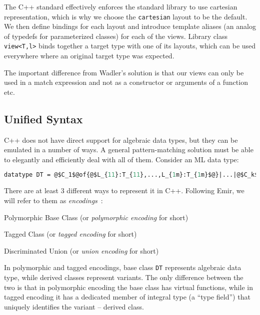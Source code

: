 \documentclass{llncs}
\makeatletter
\DeclareRobustCommand{\code}[1]{{\lstinline[keepspaces,breaklines=false,escapechar=@]{#1}}}
\makeatother
\begin{document}
\noindent
The C++ standard effectively enforces the standard library to use cartesian 
representation\cite[-4]{C++11}, which is why we choose the 
\code{cartesian} layout to be the default. We then define bindings for each 
layout and introduce template aliases (an analog of typedefs for parameterized 
classes) for each of the views. Library class \code{view<T,l>} binds together a 
target type with one of its layouts, which can be used everywhere where an 
original target type was expected.

The important difference from Wadler's solution is that our views can only be 
used in a match expression and not as a constructor or arguments of a function 
etc.

\subsection{Unified Syntax}
\label{sec:unisyn}

C++ does not have direct support for algebraic data types, but they can be 
emulated in a number of ways. A general pattern-matching solution must be able 
to elegantly and efficiently deal with all of them. Consider an ML data type: 

\begin{lstlisting}[language=ML,escapechar=@]
datatype DT = @$C_1$@of{@$L_{11}:T_{11},...,L_{1m}:T_{1m}$@}|...|@$C_k$@of{@$L_{k1}:T_{k1},...,L_{kn}:T_{kn}$@}
\end{lstlisting}

\noindent There are at least 3 different ways to represent it in C++. Following 
Emir, we will refer to them as \emph{encodings}~\cite{EmirThesis}:

\begin{compactitem}
\setlength{\itemsep}{0pt}
\setlength{\parskip}{0pt}
\item Polymorphic Base Class (or \emph{polymorphic encoding} for short)
\item Tagged Class (or \emph{tagged encoding} for short)
\item Discriminated Union (or \emph{union encoding} for short)
\end{compactitem}

\noindent
In polymorphic and tagged encodings, base class \code{DT} represents algebraic 
data type, while derived classes represent variants. The only difference between 
the two is that in polymorphic encoding the base class has virtual functions, while 
in tagged encoding it has a dedicated member of integral type  (a ``type field'')  that uniquely 
identifies the variant -- derived class. 
\end{document}
